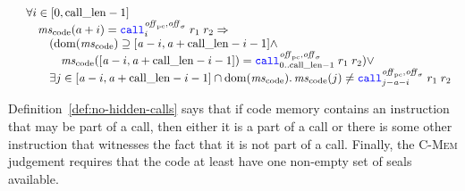 \documentclass[acmsmall,screen]{acmart}\settopmatter{}
\newenvironment{jversion}%
    {\color{OliveGreen}}{}
\begin{document}
\begin{jversion}
\begin{definition}
\[\begin{array}{l}
      \quad \forall i \in [0,\calllen - 1] \\
      \qquad \mscode(a + i) = \scall[i]{\offpc,\offsigma}{r_1}{r_2} \Rightarrow \\
      \qquad \quad (\dom(\mscode) \supseteq [\aaddr-i,\aaddr + \calllen - i - 1] \wedge\\
      \qquad \qquad \mscode([\aaddr-i,\aaddr + \calllen - i -1]) =
      \scall[0..\calllen-1]{\offpc,\offsigma}{r_1}{r_2}) \vee\\
      \qquad \quad \exists j \in [\aaddr-i,\aaddr + \calllen - i -1] \cap \dom(\mscode) \ldotp \mscode(j) \neq  \scall[j-\aaddr-i]{\offpc,\offsigma}{r_1}{r_2}
    \end{array}
  \]
\end{definition}
Definition~\ref{def:no-hidden-calls} says that if code memory contains an instruction that may be part of a call, then either it is a part of a call or there is some other instruction that witnesses the fact that it is not part of a call.
Finally, the \textsc{C-Mem} judgement requires that the code at least have one non-empty set of seals available.

\end{jversion}
\end{document}
